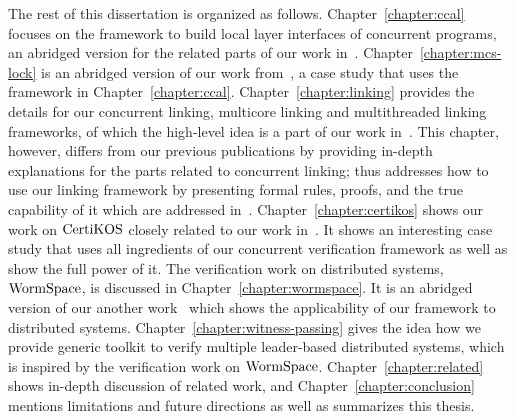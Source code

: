 The rest of this dissertation is organized as follows. Chapter~\ref{chapter:ccal} focuses 
on the framework to build local layer interfaces of concurrent programs, an abridged version for the related parts of our work in~\cite{concurrency}.
Chapter~\ref{chapter:mcs-lock} is an abridged version of our work from~\cite{mcslock},
a case study that uses the framework in Chapter~\ref{chapter:ccal}. 
Chapter~\ref{chapter:linking} provides 
the details for our concurrent linking,  multicore linking
and multithreaded linking frameworks, 
of which the high-level idea is a part of our work in~\cite{concurrency}.
This chapter, however, differs from our previous publications by providing
in-depth explanations for the parts related to concurrent linking;
thus
addresses how to use our linking framework by presenting formal rules, proofs,  and the true capability of it which 
are addressed in~\cite{concurrency}.
Chapter~\ref{chapter:certikos} shows our work on $\mathrm{CertiKOS}$
closely related to our work in~\cite{certikos:osdi16}. 
It shows an interesting case study that uses all ingredients of our concurrent verification framework as well as 
show the full power of it.
The verification work on distributed systems, $\mathrm{WormSpace}$,
is discussed in Chapter~\ref{chapter:wormspace}.
It is an abridged version of our another work~\cite{wormspace}
which shows the applicability of our framework
to distributed systems.
Chapter~\ref{chapter:witness-passing} gives the idea how we provide 
generic toolkit to verify multiple leader-based distributed systems,
which is inspired by the verification work on $\mathrm{WormSpace}$.
Chapter~\ref{chapter:related} shows in-depth discussion of related work,
 and Chapter~\ref{chapter:conclusion} mentions limitations and future directions as well as  summarizes this thesis.







